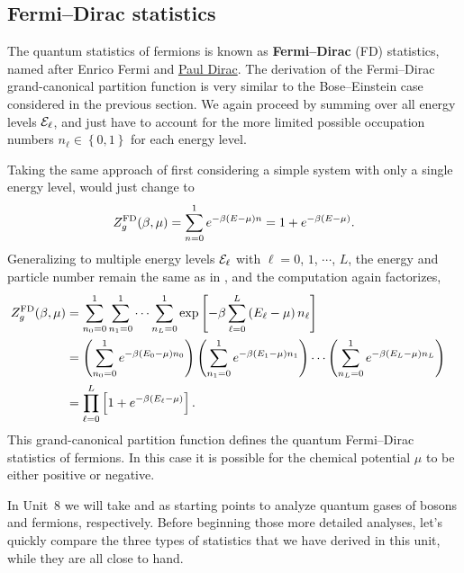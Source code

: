 \subsection{\label{sec:fermi}Fermi--Dirac statistics}
The quantum statistics of fermions is known as \textbf{Fermi--Dirac} (FD) statistics, named after Enrico Fermi and \href{https://en.wikipedia.org/wiki/Paul_Dirac}{Paul Dirac}.
The derivation of the Fermi--Dirac grand-canonical partition function is very similar to the Bose--Einstein case considered in the previous section.
We again proceed by summing over all energy levels $\mathcal E_{\ell}$, and just have to account for the more limited possible occupation numbers $n_{\ell} \in \left\{0, 1\right\}$ for each energy level.

Taking the same approach of first considering a simple system with only a single energy level,  would just change to
\begin{equation*}
  Z_g^{\text{FD}}(\beta, \mu) = \sum_{n = 0}^1 e^{-\beta (E - \mu) n} = 1 + e^{-\beta (E - \mu)}.
\end{equation*}
Generalizing to multiple energy levels $\mathcal E_{\ell}$ with $\ell = 0$, $1$, $\cdots$, $L$, the energy and particle number remain the same as in , and the computation again factorizes,
\begin{align}
  Z_g^{\text{FD}}(\beta, \mu) & = \sum_{n_0 = 0}^1 \sum_{n_1 = 0}^1 \cdots \sum_{n_L = 0}^1 \exp\left[-\beta\sum_{\ell = 0}^L \left(E_{\ell} - \mu\right) n_{\ell}\right] \cr
                 & = \left(\sum_{n_0 = 0}^1 e^{-\beta (E_0 - \mu) n_0}\right) \left(\sum_{n_1 = 0}^1 e^{-\beta (E_1 - \mu) n_1}\right)\cdots \left(\sum_{n_L = 0}^1 e^{-\beta (E_L - \mu) n_L}\right) \cr
                 & = \prod_{\ell = 0}^L \left[1 + e^{-\beta (E_{\ell} - \mu)}\right]. \label{eq:partfunc_FD}
\end{align}
This grand-canonical partition function defines the quantum Fermi--Dirac statistics of fermions.
In this case it is possible for the chemical potential $\mu$ to be either positive or negative.

In Unit~8 we will take \ZBE and \ZFD as starting points to analyze quantum gases of bosons and fermions, respectively.
Before beginning those more detailed analyses, let's quickly compare the three types of statistics that we have derived in this unit, while they are all close to hand.



